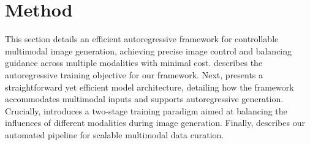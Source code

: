 \section{Method}
\label{sec:method}


This section details an efficient autoregressive framework for controllable multimodal image generation, achieving precise image control and balancing guidance across multiple modalities with minimal cost.
 describes the autoregressive training objective for our framework. Next,  presents a straightforward yet efficient model architecture, detailing how the framework accommodates multimodal inputs and supports autoregressive generation.
Crucially,  introduces a two-stage training paradigm aimed at balancing the influences of different modalities during image generation.
Finally,  describes our automated pipeline for scalable multimodal data curation.

